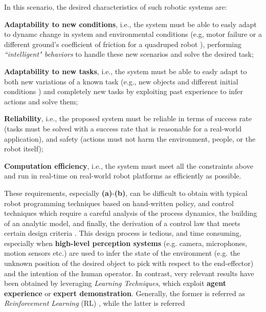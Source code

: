 In this scenario, the desired characteristics of such robotic systems are: \begin{enumerate*}[label=\textbf{(\alph*)}]
    \item \textbf{Adaptability to new conditions}, i.e., the system must be able to easly adapt to dynamc change in system and environmental conditions (e.g, motor failure or a different ground's coefficient of friction for a quadruped robot \cite{anne2021meta_learning_fast_adaptive}), performing \textit{``intelligent" behaviors} to handle these new scenarios and solve the desired task;  
    \item \textbf{Adaptability to new tasks}, i.e., the system must be able to easly adapt to both new variations of a known task (e.g., new objects and different initial conditions \cite{mandi2022towards_more_generalizable_one_shot}) and completely new tasks \cite{jang2022bc_z} by exploiting past experience to infer actions and solve them;
    \item \textbf{Reliability}, i.e., the proposed system must be reliable in terms of success rate (tasks must be solved with a success rate that is reasonable for a real-world application), and safety (actions must not harm the environment, people, or the robot itself);
    \item \textbf{Computation efficiency}, i.e., the system must meet all the constraints above and run in real-time on real-world robot platforms as efficiently as possible. 
\end{enumerate*}
\newline These requirements, especially \textbf{(a)}-\textbf{(b)}, can be difficult to obtain with typical robot programming techniques based on hand-written
policy, and control techniques which require a careful analysis of the process dynamics, the building of an analytic
model, and finally, the derivation of a control law that meets certain design criteria
\cite{hafner2011reinforcement_in_feedback_controll}. This design process is tedious, and time consuming, especially when
\textbf{high-level perception systems} (e.g. camera, microphones, motion sensors etc.) are used to infer the state of
the environment (e.g. the unknown position of the desired object to pick with respect to the end-effector) and the
intention of the human operator. \newline In contrast, very relevant results have been obtained by leveraging
\textit{Learning Techniques}, which exploit \textbf{agent experience} or \textbf{expert demonstration}. Generally, the
former is referred as \textit{Reinforcement Learning} (RL) \cite{sutton2018reinforcement}, while the latter is referred
